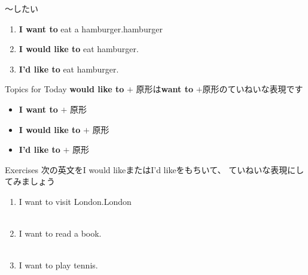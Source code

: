 \documentclass[aspectratio=169,xcolor={dvipsnames,table}]{beamer}
\begin{document}
\begin{frame}[plain]{～したい}
\large
 \begin{enumerate}
  \item \textbf{I want to} eat a hamburger.\hfill{\scriptsize hamburger }
  \item \textbf{I would like to} eat hamburger.
  \item {\bfseries I'd like to} eat hamburger.
 \end{enumerate}

\begin{block}{Topics for Today}\small
\textbf{would like to} $+$ 原形は\textbf{want to} $+$原形のていねいな表現です
\begin{itemize}[square]\small
 \item \textbf{I want to} $+$ 原形
 \item \textbf{I would like to} $+$ 原形
 \item \textbf{I'd like to} $+$ 原形
       \end{itemize}
\end{block}

\hfill{\scriptsize {}}

\end{frame}
\begin{frame}[plain]{Exercises}
次の英文をI would likeまたはI'd likeをもちいて、 ていねいな表現にしてみましょう
 \begin{enumerate}
  \item I want to visit London.\hfill{\scriptsize London }\\
\\
  \item I want to read a book.\\
\\
  \item I want to play tennis.\\
\\
 \end{enumerate}
\hfill{\scriptsize {}}

\end{frame}
\end{document}
